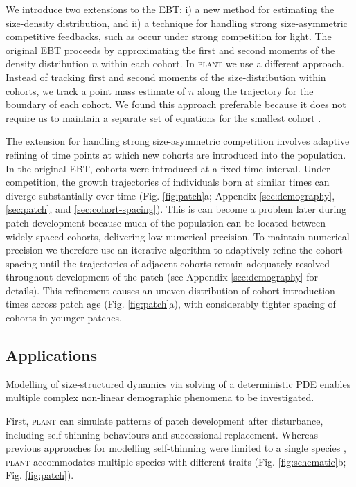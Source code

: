 \documentclass[a4paper,11pt]{article}
\newcommand{\plant}{\textsc{plant}}
\begin{document}
We introduce two extensions to the EBT: i) a new method for estimating
the size-density distribution, and ii) a technique for handling strong
size-asymmetric competitive feedbacks, such as occur under strong
competition for light. The original EBT \citep{Deroos-1997,
  Deroos-1992, Deroos-1988} proceeds by approximating the first and
second moments of the density distribution \(n\) within each
cohort. In {\plant} we use a different approach. Instead of tracking
first and second moments of the size-distribution within cohorts, we
track a point mass estimate of \(n\) along the trajectory for the
boundary of each cohort. We found this approach preferable because it
does not require us to maintain a separate set of equations for the
smallest cohort \citep{Deroos-1997}.

The extension for handling strong size-asymmetric competition involves
adaptive refining of time points at which new cohorts are introduced
into the population. In the original EBT, cohorts were introduced at a
fixed time interval. Under competition, the growth trajectories of
individuals born at similar times can diverge substantially over time
(Fig. \ref{fig:patch}a; Appendix \ref{sec:demography},
\ref{sec:patch}, and \ref{sec:cohort-spacing}). This is can become a
problem later during patch development because much of the population
can be located between widely-spaced cohorts, delivering low numerical
precision. To maintain numerical precision we therefore use an
iterative algorithm to adaptively refine the cohort spacing until the
trajectories of adjacent cohorts remain adequately resolved throughout
development of the patch (see Appendix \ref{sec:demography} for
details). This refinement causes an uneven distribution of cohort
introduction times across patch age (Fig.  \ref{fig:patch}a), with
considerably tighter spacing of cohorts in younger patches.

\subsection{Applications}

Modelling of size-structured dynamics via solving of a deterministic PDE
enables multiple complex non-linear demographic phenomena to be
investigated.

First, {\plant} can simulate patterns of patch development after
disturbance, including self-thinning behaviours and successional
replacement. Whereas previous approaches for modelling self-thinning
were limited to a single species
\citep[e.g.][]{Barnes-2004, Coomes-2007}, {\plant} accommodates multiple
 species with different traits (Fig. \ref{fig:schematic}b; Fig.
\ref{fig:patch}).
\end{document}
